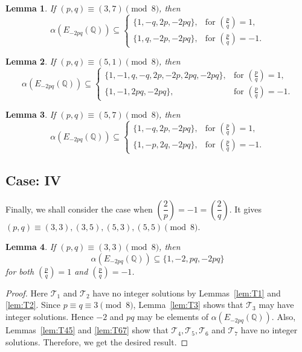 \documentclass[12pt]{amsart}
\newcommand{\bbQ}{\mathbb{Q}}
\newcommand{\cT}{\mathcal{T}}
\newcommand{\legendre}[2]{\genfrac{(}{)}{}{}{#1}{#2}}
\numberwithin{equation}{section}
\newtheorem{lem}{Lemma}[section]
\theoremstyle{definition}
\begin{document}
\begin{lem}
\label{lem:alpha_case_3.2}
If $(p,q)\equiv (3,7)\pmod 8$, then
\[
\alpha\left(E_{-2pq}(\bbQ)\right)\subseteq
\begin{cases}
\{1,-q,2p,-2pq\},
& \text{for } \legendre{p}{q}=1,\\
\{1,q,-2p,-2pq\},
& \text{for } \legendre{p}{q}=-1.
\end{cases}
\]
\end{lem}



\begin{lem}
\label{lem:alpha_case_3.3}
If $(p,q)\equiv (5,1)\pmod 8$, then
\[
\alpha\left(E_{-2pq}(\bbQ)\right)\subseteq
\begin{cases}
\{1,-1,q,-q,2p,-2p,2pq,-2pq\},
& \text{for } \legendre{p}{q}=1,\\
\{1,-1,2pq,-2pq\},
& \text{for } \legendre{p}{q}=-1.
\end{cases}
\]
\end{lem}



\begin{lem}
\label{lem:alpha_case_3.4}
If $(p,q)\equiv (5,7)\pmod 8$, then
\[
\alpha\left(E_{-2pq}(\bbQ)\right)\subseteq
\begin{cases}
\{1,-q,2p,-2pq\},
& \text{for } \legendre{p}{q}=1,\\
\{1,-p,2q,-2pq\},
& \text{for } \legendre{p}{q}=-1.
\end{cases}
\]
\end{lem}





\subsection*{Case: IV}

Finally, we shall consider the case when $\left(\dfrac{2}{p}\right)=-1=
\left(\dfrac{2}{q}\right)$. It gives 
$(p,q)\equiv (3,3),(3,5),(5,3),(5,5)\pmod 8$.



\begin{lem}
\label{lem:alpha_case_4.1}
If $(p,q)\equiv (3,3)\pmod 8$, then
\[
\alpha\left(E_{-2pq}(\bbQ)\right)\subseteq \{1,-2,pq,-2pq\}
\]
for both $\legendre{p}{q}=1$ and $\legendre{p}{q}=-1$.
\end{lem}

\begin{proof}
Here $\cT_{1}$ and $\cT_{2}$ have no integer solutions by Lemmas~\ref{lem:T1} and \ref{lem:T2}. Since $p\equiv q\equiv 3\pmod 8$, Lemma~\ref{lem:T3} shows that $\cT_{3}$ may have integer solutions. Hence $-2$ and $pq$ may be elements of $\alpha\left(E_{-2pq}(\bbQ)\right)$. Also, Lemmas~\ref{lem:T45} and \ref{lem:T67} show that $\cT_{4},\cT_{5},\cT_{6}$ and $\cT_{7}$ have no integer solutions. Therefore, we get the desired result.
\end{proof}
\end{document}
